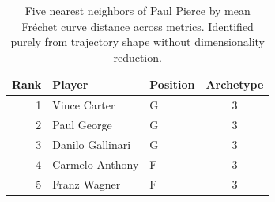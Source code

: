 \begin{table}[htbp]
  \centering\small
  \begin{tabular}{rllc}
    \toprule
    Rank & Player & Position & Archetype \\
    \midrule
    1 & Vince Carter & G & 3 \\
    2 & Paul George & G & 3 \\
    3 & Danilo Gallinari & G & 3 \\
    4 & Carmelo Anthony & F & 3 \\
    5 & Franz Wagner & F & 3 \\
    \bottomrule
  \end{tabular}
  \caption{Five nearest neighbors of Paul Pierce by mean Fr\'{e}chet curve distance across metrics. Identified purely from trajectory shape without dimensionality reduction.}
  \label{tab:Paul_Pierce_frechet_curve_neighbors}
\end{table}

